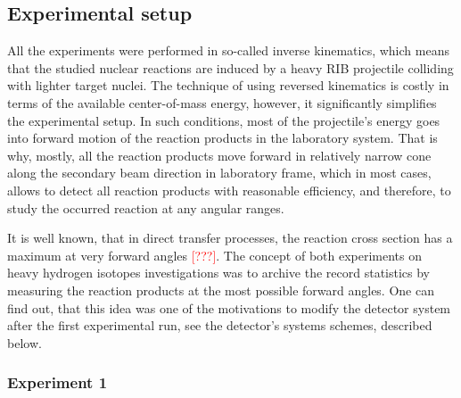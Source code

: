 \subsection{Experimental setup}

All the experiments were performed in so-called inverse kinematics, which means that the studied nuclear reactions are induced by a heavy RIB projectile colliding with lighter target nuclei.
The technique of using reversed kinematics is costly in terms of the available center-of-mass energy, however, it significantly simplifies the experimental setup.
In such conditions, most of the projectile's energy goes into forward motion of the reaction products in the laboratory system. 
That is why, mostly, all the reaction products move forward in relatively narrow cone along the secondary beam direction in laboratory frame, which in most cases, allows to detect all reaction products with reasonable efficiency, and therefore, to study the occurred reaction at any angular ranges. 

It is well known, that in direct transfer processes, the reaction cross section has a maximum at very forward angles \textcolor{red}{[???]}. 
The concept of both experiments on heavy hydrogen isotopes investigations was to archive the record statistics by measuring the reaction products at the most possible forward angles.
One can find out, that this idea was one of the motivations to modify the detector system after the first experimental run, see the detector's systems schemes, described below.


\subsubsection{Experiment 1}
\label{sec:exp-1}


